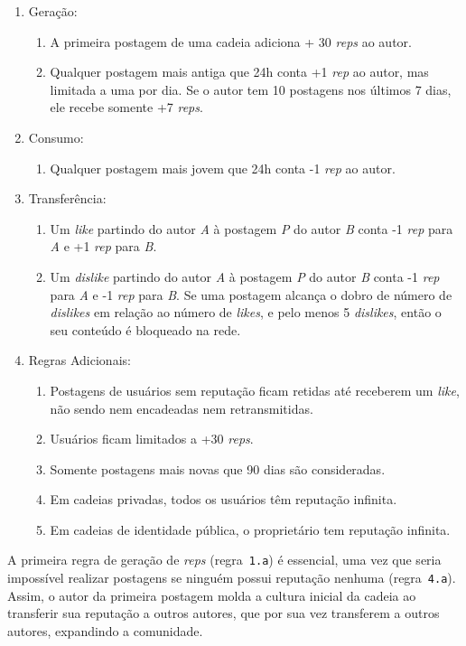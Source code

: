 \documentclass[12pt]{article}
\begin{document}
\begin{enumerate}
\item Geração:
    \begin{enumerate}
    \item A primeira postagem de uma cadeia adiciona + 30 \emph{reps} ao autor.
    \item Qualquer postagem mais antiga que 24h conta +1 \emph{rep} ao autor, mas limitada a uma por dia. Se o autor tem 10 postagens nos últimos 7 dias, ele recebe somente +7 \emph{reps}.
    \end{enumerate}
\item Consumo:
    \begin{enumerate}
    \item Qualquer postagem mais jovem que 24h conta -1 \emph{rep} ao autor.
    \end{enumerate}
\item Transferência:
    \begin{enumerate}
    \item Um \emph{like}    partindo do autor \emph{A} à postagem \emph{P} do autor \emph{B} conta -1 \emph{rep} para \emph{A} e +1 \emph{rep} para \emph{B}.
    \item Um \emph{dislike} partindo do autor \emph{A} à postagem \emph{P} do autor \emph{B} conta -1 \emph{rep} para \emph{A} e -1 \emph{rep} para \emph{B}. Se uma postagem alcança o dobro de número de \emph{dislikes} em relação ao número de \emph{likes}, e pelo menos 5 \emph{dislikes}, então o seu conteúdo é bloqueado na rede.
    \end{enumerate}
\item Regras Adicionais:
    \begin{enumerate}
    \item Postagens de usuários sem reputação ficam retidas até receberem um \emph{like}, não sendo nem encadeadas nem retransmitidas.
    \item Usuários ficam limitados a +30 \emph{reps}.
    \item Somente postagens mais novas que 90 dias são consideradas.
    \item Em cadeias privadas, todos os usuários têm reputação infinita.
    \item Em cadeias de identidade pública, o proprietário tem reputação infinita.
    \end{enumerate}
\end{enumerate}

A primeira regra de geração de \emph{reps} (regra~\texttt{1.a}) é essencial, uma vez que seria impossível realizar postagens se ninguém possui reputação nenhuma (regra~\texttt{4.a}).
Assim, o autor da primeira postagem molda a cultura inicial da cadeia ao transferir sua reputação a outros autores, que por sua vez transferem a outros autores, expandindo a comunidade.
\end{document}
